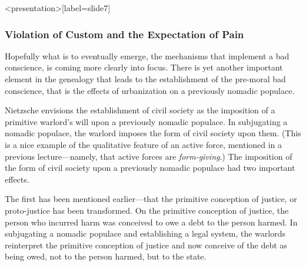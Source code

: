 \begin{frame}<presentation>[label=slide7]
    \frametitle{Violation of Custom and the Expectation of Pain}
\end{frame}

Hopefully what is to eventually emerge, the mechanisms that implement a bad conscience, is coming more clearly into focus. There is yet another important element in the genealogy that leads to the establishment of the pre-moral bad conscience, that is the effects of urbanization on a previously nomadic populace. 

Nietzsche envisions the establishment of civil society as the imposition of a primitive warlord's will upon a previously nomadic populace. In subjugating a nomadic populace, the warlord imposes the form of civil society upon them. (This is a nice example of the qualitative feature of an active force, mentioned in a previous lecture---namely, that active forces are \emph{form-giving}.) The imposition of the form of civil society upon a previously nomadic populace had two important effects. 

The first has been mentioned earlier---that the primitive conception of justice, or proto-justice has been transformed. On the primitive conception of justice, the person who incurred harm was conceived to owe a debt to the person harmed. In subjugating a nomadic populace and establishing a legal system, the warlords reinterpret the primitive conception of justice and now conceive of the debt as being owed, not to the person harmed, but to the state. 


